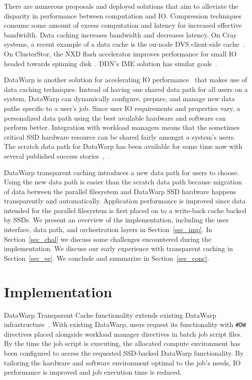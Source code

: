 \documentclass[10pt, conference, compsocconf]{IEEEtran}
\begin{document}
There are numerous proposals and deployed solutions that aim to alleviate the disparity in performance between computation and IO.  Compression techniques consume some amount of excess computation and latency for increased effective bandwidth.  Data caching increases bandwidth and decreases latency.  On Cray systems, a recent example of a data cache is the on-node DVS client-side cache~\cite{dvs_client_cache}.  On ClusterStor, the NXD flash accelerator improves performance for small IO headed towards spinning disk~\cite{nxd}.  DDN's IME solution has similar goals~\cite{ddn_ime}.

DataWarp is another solution for accelerating IO performance~\cite{cug_arch} that makes use of data caching techniques.  Instead of having one shared data path for all users on a system, DataWarp can dynamically configure, prepare, and manage new data paths specific to a user's job.  Since user IO requirements and properties vary, a personalized data path using the best available hardware and software can perform better.  Integration with workload managers means that the sometimes critical SSD hardware resource can be shared fairly amongst a system's users.  The scratch data path for DataWarp has been available for some time now with several published success stories~\cite{cug_wahid},~\cite{7836560}.

DataWarp transparent caching introduces a new data path for users to choose.  Using the new data path is easier than the scratch data path because migration of data between the parallel filesystem and DataWarp SSD hardware happens transparently and automatically.  Application performance is improved since data intended for the parallel filesystem is first placed on to a write-back cache backed by SSDs.  We present an overview of the implementation, including the user interface, data path, and orchestration layers in Section~\ref{sec_imp}.  In Section~\ref{sec_chal} we discuss some challenges encountered during the implementation.  We discuss our early experience with transparent caching in Section~\ref{sec_ee}.  We conclude and summarize in Section~\ref{sec_conc}.


\section{Implementation\label{sec_imp}}
DataWarp Transparent Cache functionality extends existing DataWarp infrastructure~\cite{cug_arch}.  With existing DataWarp, users request its functionality with \texttt{\#DW} directives placed alongside workload manager directives in batch job script files.  By the time the job script is executing, the allocated compute environment has been configured to access the requested SSD-backed DataWarp functionality.  By tailoring the hardware and software environment optimal to the job's needs, IO performance is improved and job execution time is reduced.
\end{document}
